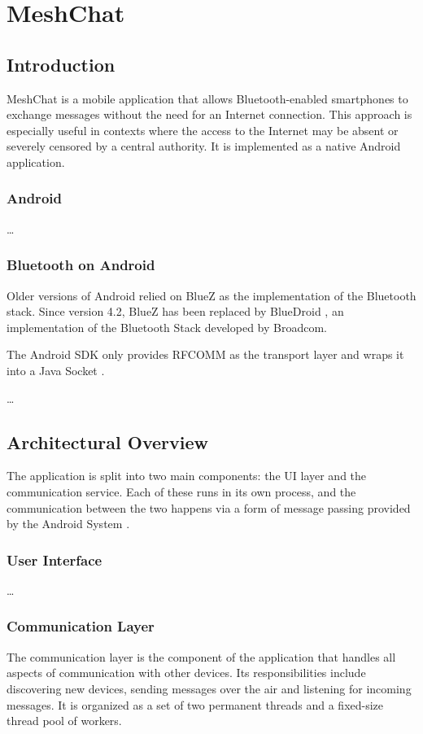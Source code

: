 \chapter{MeshChat}

\section{Introduction}
MeshChat is a mobile application that allows Bluetooth-enabled smartphones to exchange messages without the need for an Internet connection.
This approach is especially useful in contexts where the access to the Internet may be absent or severely censored by a central authority.
It is implemented as a native Android application.

\subsection{Android}
\dots

\subsection{Bluetooth on Android}
Older versions of Android relied on BlueZ \cite{bluez} as the implementation of the Bluetooth stack.
Since version 4.2, BlueZ has been replaced by BlueDroid \cite{bluedroid}, an implementation of the Bluetooth Stack developed by Broadcom. 

The Android SDK only provides RFCOMM as the transport layer \cite{android_rfcomm} and wraps it into a Java Socket \cite{android_rfcomm_java_socket}. 

\dots

\section{Architectural Overview}
The application is split into two main components: the UI layer and the communication service.
Each of these runs in its own process, and the communication between the two happens via a form of message passing provided by the Android System \cite{android_message}.

\subsection{User Interface}
\dots

\subsection{Communication Layer}
The communication layer is the component of the application that handles all aspects of communication with other devices.
Its responsibilities include discovering new devices, sending messages over the air and listening for incoming messages.
It is organized as a set of two permanent threads and a fixed-size thread pool of workers.

